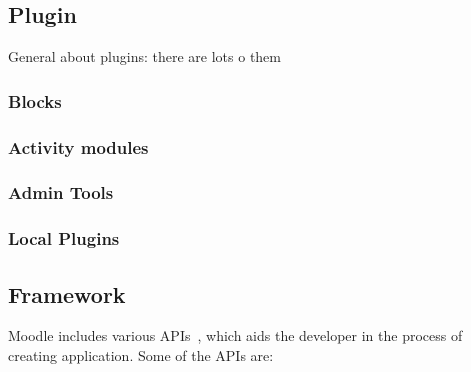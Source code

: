 \subsection{Plugin}
	General about plugins: there are lots o them 




	\subsubsection{Blocks}





	\subsubsection{Activity modules}





	\subsubsection{Admin Tools}






	\subsubsection{Local Plugins}




\subsection{Framework}
  Moodle includes various APIs~\cite{moodlecoreapis}, which aids the developer in the process of creating application. Some of the APIs are:
	
